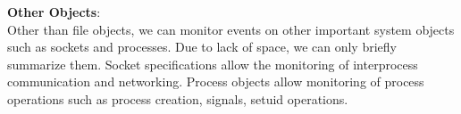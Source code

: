 \noindent
{\bf Other Objects}: \\
Other than file objects, we can monitor events on other important system
objects such as sockets and processes. Due to lack of space, we can
only briefly summarize them. Socket specifications allow
the monitoring of interprocess communication and networking.
Process objects allow monitoring of process operations
such as process creation, signals, setuid operations.


% 
% 
% 
% 
% 

